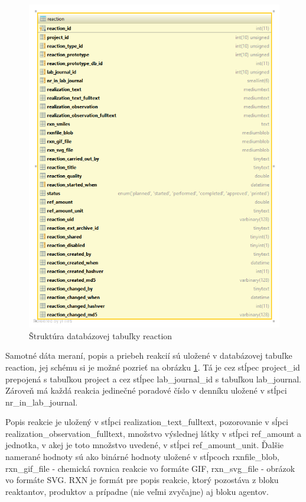 \documentclass[thesis=M,slovak]{FITthesis}[2013/05/06]
\begin{document}
\begin{figure}\centering
	\includegraphics[width=1.0\textwidth]{Schema_DB_Open_Enventory/reaction.png}
 	\caption[Štruktúra databázovej tabuľky reaction]{Štruktúra databázovej tabuľky reaction}\label{graphics:reaction}
\end{figure}

Samotné dáta meraní, popis a priebeh reakcií sú uložené v databázovej tabuľke reaction, jej schému si je možné pozrieť na obrázku \ref{graphics:reaction}. Tá je cez stĺpec project\_id prepojená s tabuľkou project a cez stĺpec lab\_journal\_id s tabuľkou lab\_journal. Zároveň má každá reakcia jedinečné poradové číslo v denníku uložené v stĺpci nr\_in\_lab\_journal.

Popis reakcie je uložený v stĺpci realization\_text\_fulltext, pozorovanie v sĺpci realization\_observation\_fulltext, množstvo výslednej látky v stĺpci ref\_amount a jednotka, v akej je toto množstvo uvedené, v stĺpci ref\_amount\_unit. Ďalšie namerané hodnoty sú ako binárné hodnoty uložené v stĺpcoch rxnfile\_blob, rxn\_gif\_file - chemická rovnica reakcie vo formáte GIF, rxn\_svg\_file - obrázok vo formáte SVG. RXN je formát pre popis reakcie, ktorý pozostáva z bloku reaktantov, produktov a prípadne (nie veľmi zvyčajne) aj bloku agentov.
\end{document}
